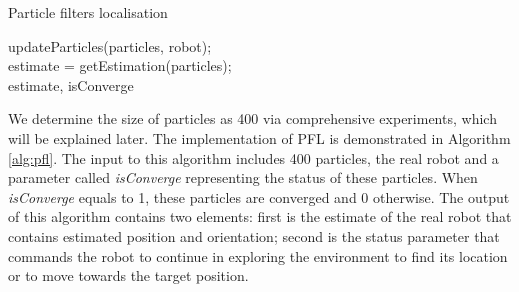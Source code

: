\documentclass[12pt]{article}
\begin{document}
\vspace{1em}
\begin{algorithm}[H]
\caption{Particle filters localisation} \label{alg:pfl}
\SetAlgoLined
  updateParticles(particles, robot); \\
  estimate = getEstimation(particles); \\
  \Return estimate, isConverge
\end{algorithm}
\vspace{1em}

We determine the size of particles as 400 via comprehensive experiments, which will be explained later. The implementation of PFL is demonstrated in Algorithm \ref{alg:pfl}. The input to this algorithm includes 400 particles, the real robot and a parameter called {\itshape isConverge} representing the status of these particles. When {\itshape isConverge} equals to 1, these particles are converged and 0 otherwise. The output of this algorithm contains two elements: first is the estimate of the real robot that contains estimated position and orientation; second is the status parameter that commands the robot to continue in exploring the environment to find its location or to move towards the target position.
\end{document}
